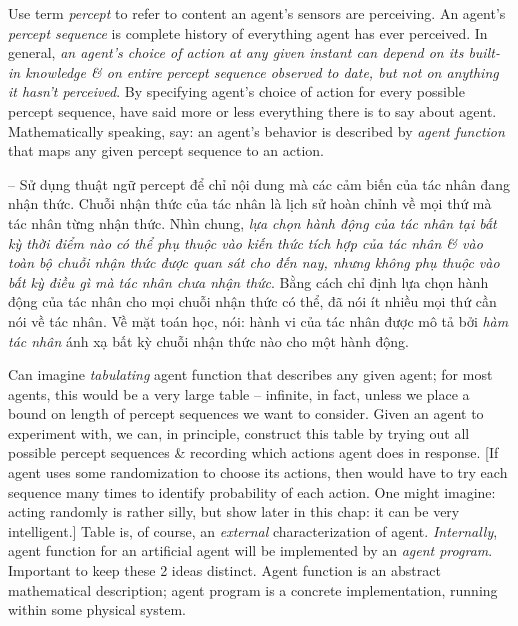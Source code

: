 \documentclass{article}
\begin{document}
\begin{itemize}
\begin{itemize}
\begin{itemize}
			Use term {\it percept} to refer to content an agent's sensors are perceiving. An agent's {\it percept sequence} is complete history of everything agent has ever perceived. In general, {\it an agent's choice of action at any given instant can depend on its built-in knowledge \& on entire percept sequence observed to date, but not on anything it hasn't perceived}. By specifying agent's choice of action for every possible percept sequence, have said more or less everything there is to say about agent. Mathematically speaking, say: an agent's behavior is described by {\it agent function} that maps any given percept sequence to an action.
			
			-- Sử dụng thuật ngữ percept để chỉ nội dung mà các cảm biến của tác nhân đang nhận thức. Chuỗi nhận thức của tác nhân là lịch sử hoàn chỉnh về mọi thứ mà tác nhân từng nhận thức. Nhìn chung, {\it lựa chọn hành động của tác nhân tại bất kỳ thời điểm nào có thể phụ thuộc vào kiến thức tích hợp của tác nhân \& vào toàn bộ chuỗi nhận thức được quan sát cho đến nay, nhưng không phụ thuộc vào bất kỳ điều gì mà tác nhân chưa nhận thức}. Bằng cách chỉ định lựa chọn hành động của tác nhân cho mọi chuỗi nhận thức có thể, đã nói ít nhiều mọi thứ cần nói về tác nhân. Về mặt toán học, nói: hành vi của tác nhân được mô tả bởi {\it hàm tác nhân} ánh xạ bất kỳ chuỗi nhận thức nào cho một hành động.
			
			Can imagine {\it tabulating} agent function that describes any given agent; for most agents, this would be a very large table -- infinite, in fact, unless we place a bound on length of percept sequences we want to consider. Given an agent to experiment with, we can, in principle, construct this table by trying out all possible percept sequences \& recording which actions agent does in response. [If agent uses some randomization to choose its actions, then would have to try each sequence many times to identify probability of each action. One might imagine: acting randomly is rather silly, but show later in this chap: it can be very intelligent.] Table is, of course, an {\it external} characterization of agent. {\it Internally}, agent function for an artificial agent will be implemented by an {\it agent program}. Important to keep these 2 ideas distinct. Agent function is an abstract mathematical description; agent program is a concrete implementation, running within some physical system.
			

\end{itemize}
\end{itemize}
\end{itemize}
\end{document}
